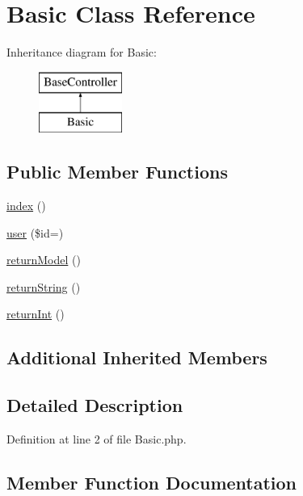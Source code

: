 \hypertarget{class_basic}{}\section{Basic Class Reference}
\label{class_basic}
Inheritance diagram for Basic\+:\begin{figure}[H]
\begin{center}
\leavevmode
\includegraphics[height=2.000000cm]{class_basic}
\end{center}
\end{figure}
\subsection*{Public Member Functions}
\begin{DoxyCompactItemize}
\item 
\hyperlink{class_basic_a149eb92716c1084a935e04a8d95f7347}{index} ()
\item 
\hyperlink{class_basic_a6603546e99f9519b86989be128736ad6}{user} (\$id=\textquotesingle{}\textquotesingle{})
\item 
\hyperlink{class_basic_a7cb6a02987f0faaef2ee4aff9198907e}{return\+Model} ()
\item 
\hyperlink{class_basic_a5bb666dcea19a9561c2047cfa25936bd}{return\+String} ()
\item 
\hyperlink{class_basic_a8d2918087022004ef5ad62d8f76a73d7}{return\+Int} ()
\end{DoxyCompactItemize}
\subsection*{Additional Inherited Members}


\subsection{Detailed Description}


Definition at line 2 of file Basic.\+php.



\subsection{Member Function Documentation}
\hypertarget{class_basic_a149eb92716c1084a935e04a8d95f7347}{}\label{class_basic_a149eb92716c1084a935e04a8d95f7347} 
